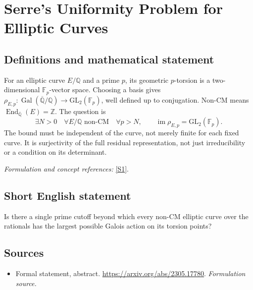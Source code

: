 \documentclass[11pt]{article}
\begin{document}
\section*{\texorpdfstring{Serre's Uniformity Problem for Elliptic Curves}{Serre's Uniformity Problem for Elliptic Curves}}\label{30002380}
\subsection{Definitions and mathematical statement}
For an elliptic curve $E/{\mathbb{Q}}$ and a prime $p$, its geometric $p$-torsion is a two-dimensional ${\mathbb{F}}_p$-vector space. Choosing a basis gives
$\rho_{E,p}:\operatorname{Gal}(\overline{{\mathbb{Q}}}/{\mathbb{Q}})\to\mathrm{GL}_2({\mathbb{F}}_p)$, well defined up to conjugation. Non-CM means $\operatorname{End}_{\overline{{\mathbb{Q}}}}(E)={\mathbb{Z}}$. The question is
\[
 \exists N>0\quad\forall E/{\mathbb{Q}}\text{ non-CM}\quad\forall p>N,
 \qquad\operatorname{im}\rho_{E,p}=\mathrm{GL}_2({\mathbb{F}}_p).
\]
The bound must be independent of the curve, not merely finite for each fixed curve. It is surjectivity of the full residual representation, not just irreducibility or a condition on its determinant.
\par\smallskip\textit{Formulation and concept references:} \href{https://arxiv.org/abs/2305.17780}{[S1]}.

\subsection{Short English statement}
Is there a single prime cutoff beyond which every non-CM elliptic curve over the rationals has the largest possible Galois action on its torsion points?
\subsection{Sources}
\begin{itemize}
\item[S1]Formal statement, abstract.
\url{https://arxiv.org/abs/2305.17780}.
\textit{Formulation source.}
\end{itemize}
\end{document}
